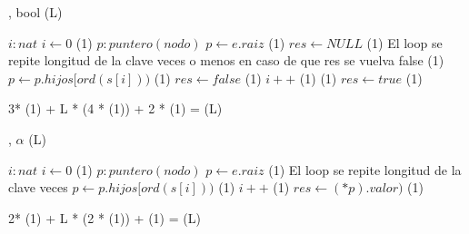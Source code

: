 {   ,
    }
    {bool}
    {\bigo(L)}
{
	\var $i : nat$
	\State $ i \gets 0$  												\comment \bigo(1) 
	\var $p : puntero(nodo)$ 
	\State $ p \gets e.raiz$											\comment \bigo(1)  
	\State $ res \gets NULL$											\comment \bigo(1)  
	\Statex             \comment El loop se repite longitud de la clave veces o menos en caso de que res se vuelva false
		                      			\comment \bigo(1)
		 	\State $p \gets p.hijos[ord(s[i]))$							\comment \bigo(1)
		 \Else
            \State $res \gets false$  									\comment \bigo(1)
     	 \EndIf	
     	\State $i++$   													\comment \bigo(1) 
    \EndWhile		
	                     							\comment \bigo(1)
		 \State $res \gets true$									\comment \bigo(1)	
	\EndIf												 

}	{  3* \bigo(1) + L * (4 * \bigo(1)) + 2 * \bigo(1) = \bigo(L) }


{   ,
    }
    {$\alpha$}
    {\bigo(L)}
{
	\var $i : nat$
	\State $ i \gets 0$  												\comment \bigo(1) 
	\var $p : puntero(nodo)$ 
	\State $ p \gets e.raiz$											\comment \bigo(1)  
     	\Statex             \comment El loop se repite longitud de la clave veces
     	\State $p \gets p.hijos[ord(s[i]))$								\comment \bigo(1)
     	\State $i++$   													\comment \bigo(1) 
    \EndWhile		
	\State $res \gets (*p).valor)$										\comment \bigo(1)												 

}	{  2* \bigo(1) + L * (2 * \bigo(1)) + \bigo(1) = \bigo(L) }

